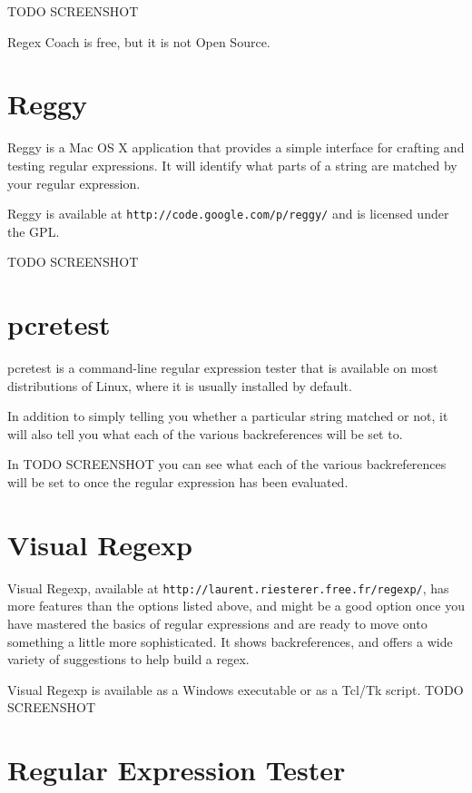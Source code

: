 TODO SCREENSHOT

Regex Coach is free, but it is not Open Source.

\section{Reggy}
\label{reggy}

Reggy is a Mac OS X application that provides a simple interface for
crafting and testing regular expressions. It will identify what parts of
a string are matched by your regular expression.

Reggy is available at \verb=http://code.google.com/p/reggy/= and is
licensed under the GPL.

TODO SCREENSHOT

\section{pcretest}
\label{pcretest}

pcretest is a command-line regular expression tester that is available
on most distributions of Linux, where it is usually installed by
default.

In addition to simply telling you whether a particular string matched or
not, it will also tell you what each of the various backreferences will
be set to.

In TODO SCREENSHOT you can see what each of the various backreferences
will be set to once the regular expression has been evaluated.

\section{Visual Regexp}
\label{visualregexp}

Visual Regexp, available at \verb=http://laurent.riesterer.free.fr/regexp/=, has more features
than the options listed above, and might be a good option once you have
mastered the basics of regular expressions and are ready to move onto
something a little more sophisticated. It shows backreferences, and
offers a wide variety of suggestions to help build a regex.

Visual Regexp is available as a Windows executable or as a Tcl/Tk
script. TODO SCREENSHOT

\section{Regular Expression Tester}

